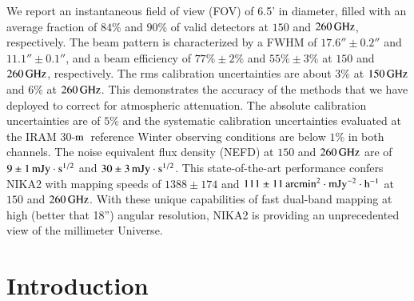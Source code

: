 \documentclass[traditionalabstract]{aa}
\newcommand{\trentemetre}{30-$\rm{m}$}
\newcommand{\lp}[1]{#1}
\begin{document}
       {We report an instantaneous field of view (FOV) of 6.5'
         in diameter, filled with an average fraction of $84\%$ and 
         $90\%$ of %
         valid detectors
         at $150$ and $260\,\rm{GHz}$, respectively. The beam pattern
         is characterized by a FWHM of $17.6'' \pm 0.2''$
         and  $11.1''\pm 0.1''$, and a beam efficiency of
         $77\% \pm 2\%$ and $55\% \pm 3\%$
         at $150$ and $260\,\rm{GHz}$, respectively.
         The rms calibration uncertainties are about $3\%$ at $150\,\rm{GHz}$ 
         and $6\%$ at $260\,\rm{GHz}$. This demonstrates
         the accuracy of the methods that we have deployed to correct
         for atmospheric attenuation. {\lp The absolute
           calibration uncertainties are of $5\%$ and the systematic
           calibration uncertainties evaluated at the IRAM
           \trentemetre\ reference Winter observing conditions are
           below $1\%$ in both channels.}
         The noise equivalent
         flux density (NEFD) at $150$ and $260\,\rm{GHz}$ are of
         $9 \pm 1\, \rm{mJy}\cdot s^{1/2}$ and
         $30 \pm 3\, \rm{mJy}\cdot s^{1/2}$. 
         This state-of-the-art performance confers NIKA2 with
         mapping speeds of $1388 \pm 174$ and
         $111 \pm 11 \, \rm{arcmin}^2\cdot \rm{mJy}^{-2}\cdot
         \rm{h}^{-1}$
         at $150$ and $260\,\rm{GHz}$.}
       {With these unique capabilities of fast dual-band mapping at
         high (better that 18'') angular resolution, NIKA2 is providing an unprecedented view
         of the millimeter Universe.}      
   \maketitle
\section{Introduction}
\label{se:intro}



\end{document}
